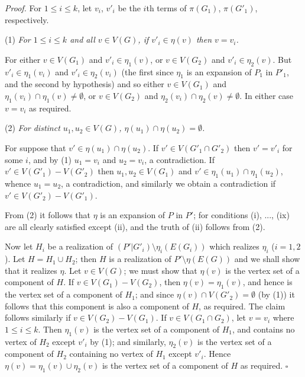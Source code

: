 \textit{Proof.} For $1 \le i \le k$, let $v_i$, $v'_i$ be the $i$th terms of $\pi(G_1)$, $\pi(G'_1)$, respectively.

\hspace*{12pt}(1) \textit{For $1 \le i \le k$ and all $v \in V(G)$, if $v'_i \in \eta(v)$ then $v = v_i$.}

For either $v \in V(G_1)$ and $v'_i \in \eta_1(v)$, or $v \in V(G_2)$ and $v'_i \in \eta_2(v)$. But $v'_i \in \eta_1(v_i)$ and $v'_i \in \eta_2(v_i)$ (the first since $\eta_1$ is an expansion of $P_1$ in $P'_1$, and the second by hypothesis) and so either $v \in V(G_1)$ and $\eta_1(v_i) \cap \eta_1(v) \ne \emptyset$, or $v \in V(G_2)$ and $\eta_2(v_i) \cap \eta_2(v) \ne \emptyset$. In either case $v = v_i$ as required.

\hspace*{12pt}(2) \textit{For distinct $u_1, u_2 \in V(G)$, $\eta(u_1) \cap \eta(u_2) = \emptyset$.}

For suppose that $v' \in \eta(u_1) \cap \eta(u_2)$. If $v' \in V(G'_1 \cap G'_2)$ then $v' = v'_i$ for some $i$, and by (1) $u_1 = v_i$ and $u_2 = v_i$, a contradiction. If $v' \in V(G'_1) - V(G'_2)$ then $u_1, u_2 \in V(G_1)$ and $v' \in \eta_1(u_1) \cap \eta_1(u_2)$, whence $u_1 = u_2$, a contradiction, and similarly we obtain a contradiction if $v' \in V(G'_2) - V(G'_1)$.

From (2) it follows that $\eta$ is an expansion of $P$ in $P'$; for conditions (i), ..., (ix) are all clearly satisfied except (ii), and the truth of (ii) follows from (2).

Now let $H_i$ be a realization of $(P' | G'_i) \setminus \eta_i(E(G_i))$ which realizes $\eta_i$ ($i = 1, 2$). Let $H = H_1 \cup H_2$; then $H$ is a realization of $P' \setminus \eta(E(G))$ and we shall show that it realizes $\eta$. Let $v \in V(G)$; we must show that $\eta(v)$ is the vertex set of a component of $H$. If $v \in V(G_1) - V(G_2)$, then $\eta(v) = \eta_1(v)$, and hence is the vertex set of a component of $H_1$; and since $\eta(v) \cap V(G'_2) = \emptyset$ (by (1)) it follows that this component is also a component of $H$, as required. The claim follows similarly if $v \in V(G_2) - V(G_1)$. If $v \in V(G_1 \cap G_2)$, let $v = v_i$ where $1 \le i \le k$. Then $\eta_1(v)$ is the vertex set of a component of $H_1$, and contains no vertex of $H_2$ except $v'_i$ by (1); and similarly, $\eta_2(v)$ is the vertex set of a component of $H_2$ containing no vertex of $H_1$ except $v'_i$. Hence $\eta(v) = \eta_1(v) \cup \eta_2(v)$ is the vertex set of a component of $H$ as required. $\square$

